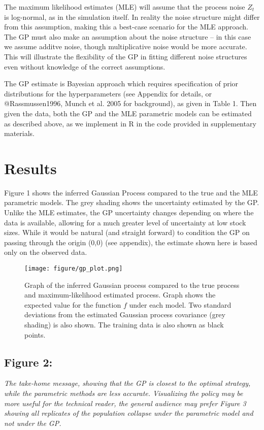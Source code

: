 \documentclass[author-year, review]{elsarticle} %
\makeatletter
\def\maxwidth{\ifdim\Gin@nat@width>\linewidth\linewidth
\else\Gin@nat@width\fi}
\let\Oldincludegraphics\includegraphics
\renewcommand{\includegraphics}[1]{\Oldincludegraphics[width=\maxwidth]{#1}}
\makeatother
\begin{document}
The maximum likelihood estimates (MLE) will assume that the process
noise $Z_t$ is log-normal, as in the simulation itself. In reality the
noise structure might differ from this assumption, making this a
best-case scenario for the MLE approach.\\The GP must also make an
assumption about the noise structure -- in this case we assume additve
noise, though multiplicative noise would be more accurate. This will
illustrate the flexibility of the GP in fitting different noise
structures even without knowledge of the correct assumptions.

The GP estimate is Bayesian approach which requires specification of
prior distributions for the hyperparameters (see Appendix for details,
or @Rassmussen1996, Munch et al. 2005 for background), as given in Table
1. Then given the data, both the GP and the MLE parametric models can be
estimated as described above, as we implement in R in the code provided
in supplementary materials.

\section{Results}

Figure 1 shows the inferred Gaussian Process compared to the true and
the MLE parametric models. The grey shading shows the uncertainty
estimated by the GP. Unlike the MLE estimates, the GP uncertainty
changes depending on where the data is available, allowing for a much
greater level of uncertainty at low stock sizes. While it would be
natural (and straight forward) to condition the GP on passing through
the origin (0,0) (see appendix), the estimate shown here is based only
on the observed data.

\begin{figure}[htbp]
\centering
\texttt{[image: figure/gp\_plot.png]}
\caption{Graph of the inferred Gaussian process compared to the true
process and maximum-likelihood estimated process. Graph shows the
expected value for the function $f$ under each model. Two standard
deviations from the estimated Gaussian process covariance (grey shading)
is also shown. The training data is also shown as black points.}
\end{figure}

\subsection{Figure 2:}

\emph{The take-home message, showing that the GP is closest to the
optimal strategy, while the parametric methods are less accurate.
Visualizing the policy may be more useful for the technical reader, the
general audience may prefer Figure 3 showing all replicates of the
population collapse under the parametric model and not under the GP.}
\end{document}
